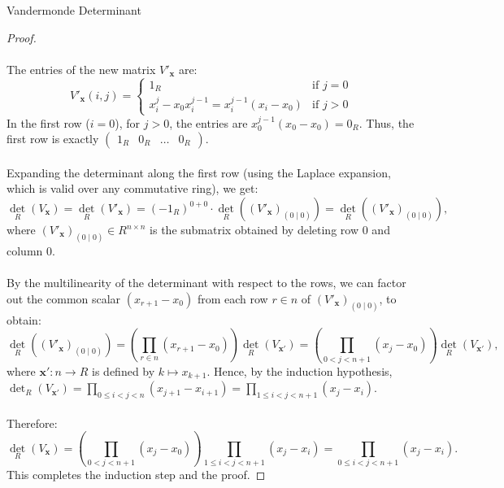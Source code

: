 \begin{appendixitem}{Vandermonde Determinant}
\begin{proof}
        \\\\
        The entries of the new matrix \( V'_{\boldsymbol{x}} \) are:
        \[
            V'_{\boldsymbol{x}}\left(i, j\right) =
            \begin{cases}
                1_R & \text{if } j = 0 \\
                x_i^j - x_0 x_i^{j-1} = x_i^{j-1}\left(x_i - x_0\right) & \text{if } j > 0
            \end{cases}
        \]
        In the first row (\( i = 0 \)), for \( j > 0 \), the entries are \( x_0^{j-1}\left(x_0 - x_0\right) = 0_R \). Thus, the first row is exactly \( \begin{pmatrix} 1_R & 0_R & \dots & 0_R \end{pmatrix} \).
        \\\\
        Expanding the determinant along the first row (using the Laplace expansion, which is valid over any commutative ring), we get:
        \[
            \operatorname{det}_R\left(V_{\boldsymbol{x}}\right) = \operatorname{det}_R\left(V'_{\boldsymbol{x}}\right) = \left(-1_R\right)^{0+0} \cdot \operatorname{det}_R\left(\left(V'_{\boldsymbol{x}}\right)_{\left(0\mid0\right)}\right) = \operatorname{det}_R\left(\left(V'_{\boldsymbol{x}}\right)_{\left(0\mid0\right)}\right),
        \]
        where \( \left(V'_{\boldsymbol{x}}\right)_{\left(0\mid0\right)} \in R^{n \times n} \) is the submatrix obtained by deleting row \( 0 \) and column \( 0 \).
        \\\\
        By the multilinearity of the determinant with respect to the rows, we can factor out the common scalar \( \left(x_{r+1} - x_0\right) \) from each row \( r \in n \) of \( \left(V'_{\boldsymbol{x}}\right)_{\left(0\mid0\right)} \), to obtain:
        \[
            \operatorname{det}_R\left(\left(V'_{\boldsymbol{x}}\right)_{\left(0\mid0\right)}\right) = \left( \prod_{r\in n}\left(x_{r+1} - x_0\right) \right) \operatorname{det}_R\left(V_{\boldsymbol{x}'}\right) = \left( \prod_{0<j<n+1} \left(x_{j} - x_0\right) \right) \operatorname{det}_R\left(V_{\boldsymbol{x}'}\right),
        \]
        where \( \boldsymbol{x}' \colon n \to R \) is defined by \( k \mapsto x_{k+1} \). Hence, by the induction hypothesis, \( \operatorname{det}_R\left(V_{\boldsymbol{x}'}\right) = \prod_{0 \leq i < j < n} \left(x_{j+1} - x_{i+1}\right) = \prod_{1 \leq i < j < n+1} \left(x_{j} - x_{i}\right) \).
        \\\\
        Therefore:
        \[
            \operatorname{det}_R\left(V_{\boldsymbol{x}}\right) = \left( \prod_{0<j<n+1} \left(x_{j} - x_0\right) \right) \prod_{1 \leq i < j < n+1} \left(x_{j} - x_{i}\right) = \prod_{0 \leq i < j < n+1} \left(x_j - x_i\right).
        \]
        This completes the induction step and the proof.
    \end{proof}
\end{appendixitem}
